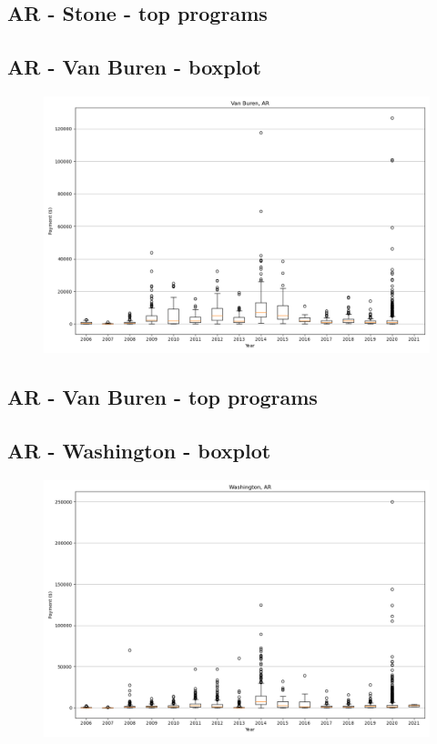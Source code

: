 \subsection*{AR - Stone - top programs}

\newpage
\subsection*{AR - Van Buren - boxplot}
\begin{figure}[h]
\centering
\includegraphics[width=7in]{../output/boxplots/counties/Van Buren-AR_boxplot.png}
\end{figure}


\subsection*{AR - Van Buren - top programs}

\newpage
\subsection*{AR - Washington - boxplot}
\begin{figure}[h]
\centering
\includegraphics[width=7in]{../output/boxplots/counties/Washington-AR_boxplot.png}
\end{figure}


